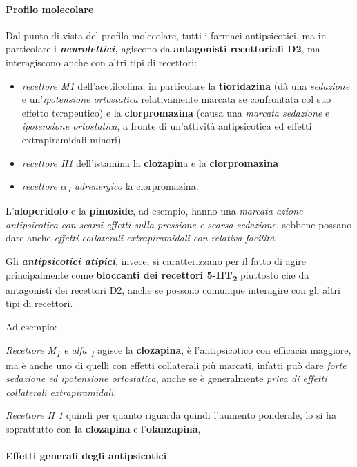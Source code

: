 \paragraph{Profilo molecolare}

Dal punto di vista del profilo molecolare, tutti i farmaci
antipsicotici, ma in particolare i \textbf{\emph{neurolettici,}}
agiscono da \textbf{antagonisti recettoriali D2}, ma interagiscono anche
con altri tipi di recettori:

\begin{itemize}
\item
  \emph{recettore M1} dell'acetilcolina, in particolare la
  \textbf{tioridazina} (dà una \emph{sedazione} e un'\emph{ipotensione
  ortostatica} relativamente marcata se confrontata col suo effetto
  terapeutico) e la \textbf{clorpromazina} (causa una \emph{marcata
  sedazione} e \emph{ipotensione ortostatica}, a fronte di un'attività
  antipsicotica ed effetti extrapiramidali minori)
\item
  \emph{recettore H1} dell'istamina la \textbf{clozapin}a e la
  \textbf{clorpromazina }
\item
  \emph{recettore $\alpha$\textsubscript{1} adrenergico} la clorpromazina.
\end{itemize}

L'\textbf{aloperidolo} e la \textbf{pimozide}, ad esempio, hanno una
\emph{marcata azione antipsicotica con scarsi effetti sulla pressione e
scarsa sedazione}, sebbene possano dare anche \emph{effetti collaterali
extrapiramidali con relativa facilità}.

Gli \textbf{\emph{antipsicotici atipici}}, invece, si caratterizzano per
il fatto di agire principalmente come \textbf{bloccanti dei recettori
5-HT\textsubscript{2}} piuttosto che da antagonisti dei recettori D2,
anche se possono comunque interagire con gli altri tipi di recettori.

Ad esempio:

\emph{Recettore M\textsubscript{1} e alfa \textsubscript{1}} agisce la
\textbf{clozapina}, è l'antipsicotico con efficacia maggiore, ma è anche
uno di quelli con effetti collaterali più marcati, infatti può dare
\emph{forte sedazione ed ipotensione ortostatica}, anche se è
generalmente \emph{priva di effetti collaterali extrapiramidali}.

\emph{Recettore H 1} quindi per quanto riguarda quindi l'aumento
ponderale, lo si ha soprattutto con \textbf{l}a \textbf{clozapina} e
l'\textbf{olanzapina},

\paragraph{Effetti generali degli antipsicotici}

